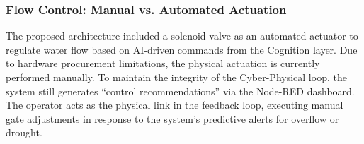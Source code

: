 \subsubsection{Flow Control: Manual vs. Automated Actuation}
The proposed architecture included a solenoid valve as an automated actuator to regulate water flow based on AI-driven commands from the Cognition layer. Due to hardware procurement limitations, the physical actuation is currently performed manually. To maintain the integrity of the Cyber-Physical loop, the system still generates ``control recommendations'' via the Node-RED dashboard. The operator acts as the physical link in the feedback loop, executing manual gate adjustments in response to the system's predictive alerts for overflow or drought.

